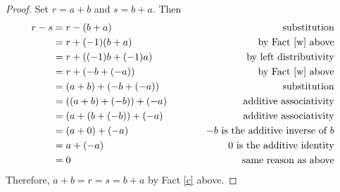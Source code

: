\documentclass[12pt]{article}
\begin{document}
\begin{proof}  Set $r=a+b$ and $s=b+a$.  Then 
\begin{alignat*}{2}
r-s &=r-(b+a) &\quad \qquad \text{substitution} \\
&=r+(-1)(b+a) &\quad \qquad \text{by Fact \ref{w} above} \\
&= r+((-1)b+(-1)a) &\quad \qquad \text{by left distributivity} \\
&= r+(-b+(-a)) &\quad \qquad \text{by Fact \ref{w} above} \\
&= (a+b)+(-b+(-a)) &\quad \qquad \text{substitution} \\
&= ((a+b)+(-b))+(-a) &\quad \qquad \text{additive associativity} \\
&= (a+(b+(-b))+(-a) &\quad \qquad \text{additive associativity} \\
&= (a+0)+(-a) &\quad \qquad -b \text{ is the additive inverse of } b\\
&= a+(-a) &\quad \qquad 0 \text{ is the additive identity} \\
&= 0 &\quad \qquad \text{same reason as above}
\end{alignat*}
Therefore, $a+b=r=s=b+a$ by Fact \ref{c} above.
\end{proof}
\end{document}
